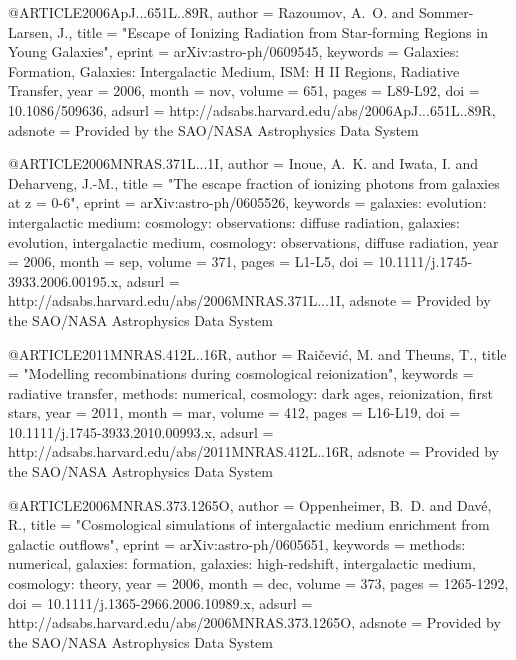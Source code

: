\documentclass{article}
\begin{document}
@ARTICLE{2006ApJ...651L..89R,
   author = {{Razoumov}, A.~O. and {Sommer-Larsen}, J.},
    title = "{Escape of Ionizing Radiation from Star-forming Regions in Young Galaxies}",
   eprint = {arXiv:astro-ph/0609545},
 keywords = {Galaxies: Formation, Galaxies: Intergalactic Medium, ISM: H II Regions, Radiative Transfer},
     year = 2006,
    month = nov,
   volume = 651,
    pages = {L89-L92},
      doi = {10.1086/509636},
   adsurl = {http://adsabs.harvard.edu/abs/2006ApJ...651L..89R},
  adsnote = {Provided by the SAO/NASA Astrophysics Data System}
}

@ARTICLE{2006MNRAS.371L...1I,
   author = {{Inoue}, A.~K. and {Iwata}, I. and {Deharveng}, J.-M.},
    title = "{The escape fraction of ionizing photons from galaxies at z = 0-6}",
   eprint = {arXiv:astro-ph/0605526},
 keywords = {galaxies: evolution: intergalactic medium: cosmology: observations: diffuse radiation, galaxies: evolution, intergalactic medium, cosmology: observations, diffuse radiation},
     year = 2006,
    month = sep,
   volume = 371,
    pages = {L1-L5},
      doi = {10.1111/j.1745-3933.2006.00195.x},
   adsurl = {http://adsabs.harvard.edu/abs/2006MNRAS.371L...1I},
  adsnote = {Provided by the SAO/NASA Astrophysics Data System}
}

@ARTICLE{2011MNRAS.412L..16R,
   author = {{Rai{\v c}evi{\'c}}, M. and {Theuns}, T.},
    title = "{Modelling recombinations during cosmological reionization}",
 keywords = {radiative transfer, methods: numerical, cosmology: dark ages, reionization, first stars},
     year = 2011,
    month = mar,
   volume = 412,
    pages = {L16-L19},
      doi = {10.1111/j.1745-3933.2010.00993.x},
   adsurl = {http://adsabs.harvard.edu/abs/2011MNRAS.412L..16R},
  adsnote = {Provided by the SAO/NASA Astrophysics Data System}
}

@ARTICLE{2006MNRAS.373.1265O,
   author = {{Oppenheimer}, B.~D. and {Dav{\'e}}, R.},
    title = "{Cosmological simulations of intergalactic medium enrichment from galactic outflows}",
   eprint = {arXiv:astro-ph/0605651},
 keywords = {methods: numerical, galaxies: formation, galaxies: high-redshift, intergalactic medium, cosmology: theory},
     year = 2006,
    month = dec,
   volume = 373,
    pages = {1265-1292},
      doi = {10.1111/j.1365-2966.2006.10989.x},
   adsurl = {http://adsabs.harvard.edu/abs/2006MNRAS.373.1265O},
  adsnote = {Provided by the SAO/NASA Astrophysics Data System}
}
\end{document}
